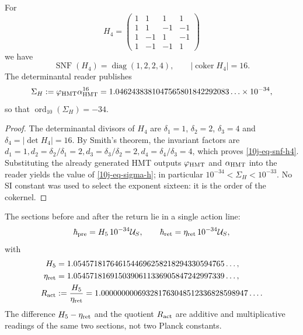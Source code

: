 \begin{theorem}
\label{10j-thm-escala-menos34}
For
\begin{equation}
 H_4=
 \begin{pmatrix}
 1&1&1&1\\
 1&1&-1&-1\\
 1&-1&1&-1\\
 1&-1&-1&1
 \end{pmatrix}
 \label{10j-eq-h4}
\end{equation}
we have
\begin{equation}
 \operatorname{SNF}(H_4)=\operatorname{diag}(1,2,2,4),
 \qquad |\operatorname{coker}H_4|=16.
 \label{10j-eq-snf-h4}
\end{equation}
The determinantal reader publishes
\begin{equation}
 \Sigma_H:=\varphi_{\rm HMT}\alpha_{\rm HMT}^{16}
 =1.0462438381047565801842292083\ldots\times10^{-34},
 \label{10j-eq-sigma-h}
\end{equation}
so that \(\operatorname{ord}_{10}(\Sigma_H)=-34\).
\end{theorem}

\begin{proof}
The determinantal divisors of \(H_4\) are \(\delta_1=1\), \(\delta_2=2\), \(\delta_3=4\) and \(\delta_4=|\det H_4|=16\). By Smith's theorem, the invariant factors are \(
 d_1=1,
 d_2=\delta_2/\delta_1=2,
 d_3=\delta_3/\delta_2=2,
 d_4=\delta_4/\delta_3=4
\), which proves \eqref{10j-eq-snf-h4}. Substituting the already generated HMT outputs \(\varphi_{\rm HMT}\) and \(\alpha_{\rm HMT}\) into the reader yields the value of \eqref{10j-eq-sigma-h}; in particular \(10^{-34}<\Sigma_H<10^{-33}\). No SI constant was used to select the exponent sixteen: it is the order of the cokernel.
\end{proof}

The sections before and after the return lie in a single action line:
\begin{equation}
 \hbar_{\rm pre}=H_5\,10^{-34}\mathcal U_S,
 \qquad
 \hbar_{\rm ret}=\eta_{\rm ret}\,10^{-34}\mathcal U_S,
 \label{10j-eq-secciones-accion}
\end{equation}
with
\begin{align}
 H_5&=1.0545718176461544696258218294330594765\ldots,\notag\\
 \eta_{\rm ret}&=1.0545718169150390611336905847242997339\ldots,\notag\\
 R_{\rm act}&:=\frac{H_5}{\eta_{\rm ret}}
 =1.000000000693281763048512336828598947\ldots .
 \label{10j-eq-ract}
\end{align}
The difference \(H_5-\eta_{\rm ret}\) and the quotient \(R_{\rm act}\) are additive and multiplicative readings of the same two sections, not two Planck constants.

